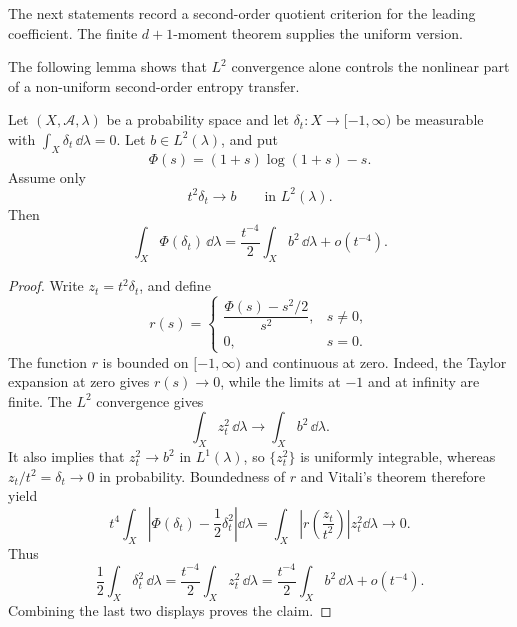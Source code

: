 The next statements record a second-order quotient criterion for the leading
coefficient.  The finite \(d+1\)-moment theorem supplies the uniform version.

\noindent The following lemma shows that \(L^2\) convergence alone controls
the nonlinear part of a non-uniform second-order entropy transfer.

\begin{lemma}%
\label{lem:l2-second-order-entropy-criterion}
Let \((X,\mathcal A,\lambda)\) be a probability space and let
\(\delta_t:X\to[-1,\infty)\) be measurable with
\(\int_X\delta_t\,\dd\lambda=0\).  Let \(b\in L^2(\lambda)\), and put
\[
  \Phi(s)=(1+s)\log(1+s)-s .
\]
Assume only
\[
  t^2\delta_t\longrightarrow b
  \qquad\text{in }L^2(\lambda).
\]
Then
\[
  \int_X\Phi(\delta_t)\,\dd\lambda
  =\frac{t^{-4}}2\int_X b^2\,\dd\lambda+o(t^{-4}).
\]
\end{lemma}

\ifdefined\JFAArticleMain
{}
\else
\begin{proof}
Write \(z_t=t^2\delta_t\), and define
\[
r(s)=
\begin{cases}
\dfrac{\Phi(s)-s^2/2}{s^2},&s\ne0,\\[4pt]
0,&s=0.
\end{cases}
\]
The function \(r\) is bounded on \([-1,\infty)\) and continuous at zero.
Indeed, the Taylor expansion at zero gives \(r(s)\to0\), while the limits at
\(-1\) and at infinity are finite.  The \(L^2\) convergence gives
\[
  \int_X z_t^2\,\dd\lambda\to\int_X b^2\,\dd\lambda .
\]
It also implies that \(z_t^2\to b^2\) in \(L^1(\lambda)\), so
\(\{z_t^2\}\) is uniformly integrable, whereas
\(z_t/t^2=\delta_t\to0\) in probability.  Boundedness of \(r\) and Vitali's
theorem therefore yield
\[
t^4\int_X\left|\Phi(\delta_t)-\frac12\delta_t^2\right|\dd\lambda
=\int_X\left|r\!\left(\frac{z_t}{t^2}\right)\right|z_t^2\dd\lambda
\longrightarrow0.
\]
Thus
\[
  \frac12\int_X\delta_t^2\,\dd\lambda
  =\frac{t^{-4}}2\int_Xz_t^2\,\dd\lambda
  =\frac{t^{-4}}2\int_Xb^2\,\dd\lambda+o(t^{-4}).
\]
Combining the last two displays proves the claim.
\end{proof}
\fi

\medskip

